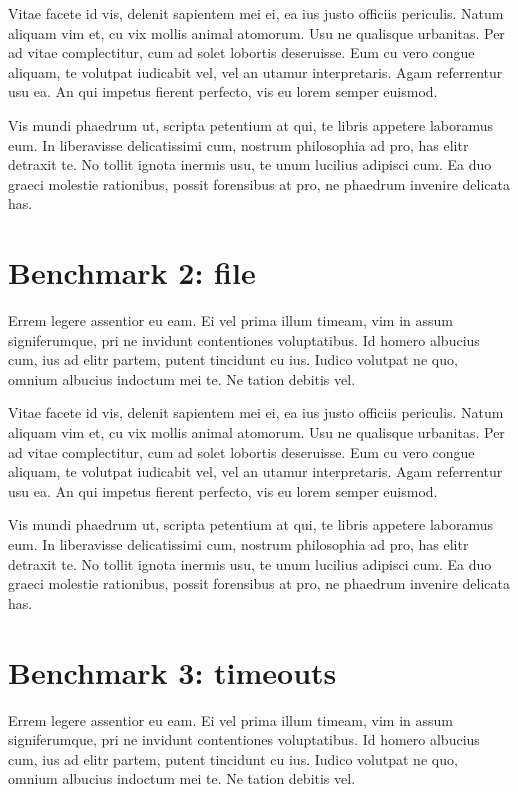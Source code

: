 \documentclass[a4paper,11pt,oneside]{report}
\begin{document}
Vitae facete id vis, delenit sapientem mei ei, ea ius justo officiis
periculis. Natum aliquam vim et, cu vix mollis animal atomorum. Usu ne qualisque
urbanitas. Per ad vitae complectitur, cum ad solet lobortis deseruisse. Eum cu
vero congue aliquam, te volutpat iudicabit vel, vel an utamur
interpretaris. Agam referrentur usu ea. An qui impetus fierent perfecto, vis eu
lorem semper euismod.

Vis mundi phaedrum ut, scripta petentium at qui, te libris appetere laboramus
eum. In liberavisse delicatissimi cum, nostrum philosophia ad pro, has elitr
detraxit te. No tollit ignota inermis usu, te unum lucilius adipisci cum. Ea duo
graeci molestie rationibus, possit forensibus at pro, ne phaedrum invenire
delicata has.

\section{Benchmark 2: file}

Errem legere assentior eu eam. Ei vel prima illum timeam, vim in assum
signiferumque, pri ne invidunt contentiones voluptatibus. Id homero albucius
cum, ius ad elitr partem, putent tincidunt cu ius. Iudico volutpat ne quo,
omnium albucius indoctum mei te. Ne tation debitis vel.

Vitae facete id vis, delenit sapientem mei ei, ea ius justo officiis
periculis. Natum aliquam vim et, cu vix mollis animal atomorum. Usu ne qualisque
urbanitas. Per ad vitae complectitur, cum ad solet lobortis deseruisse. Eum cu
vero congue aliquam, te volutpat iudicabit vel, vel an utamur
interpretaris. Agam referrentur usu ea. An qui impetus fierent perfecto, vis eu
lorem semper euismod.

Vis mundi phaedrum ut, scripta petentium at qui, te libris appetere laboramus
eum. In liberavisse delicatissimi cum, nostrum philosophia ad pro, has elitr
detraxit te. No tollit ignota inermis usu, te unum lucilius adipisci cum. Ea duo
graeci molestie rationibus, possit forensibus at pro, ne phaedrum invenire
delicata has.

\section{Benchmark 3: timeouts}

Errem legere assentior eu eam. Ei vel prima illum timeam, vim in assum
signiferumque, pri ne invidunt contentiones voluptatibus. Id homero albucius
cum, ius ad elitr partem, putent tincidunt cu ius. Iudico volutpat ne quo,
omnium albucius indoctum mei te. Ne tation debitis vel.
\end{document}
